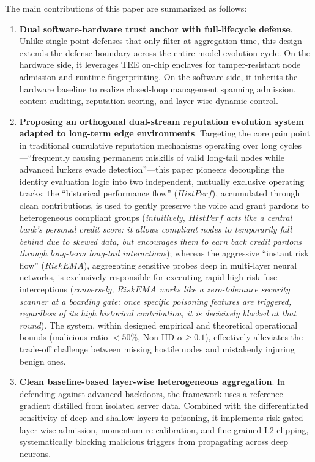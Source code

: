 \documentclass[runningheads]{llncs}
\begin{document}
The main contributions of this paper are summarized as follows:
\begin{enumerate}
    \item \textbf{Dual software-hardware trust anchor with full-lifecycle defense}. Unlike single-point defenses that only filter at aggregation time, this design extends the defense boundary across the entire model evolution cycle. On the hardware side, it leverages TEE on-chip enclaves for tamper-resistant node admission and runtime fingerprinting. On the software side, it inherits the hardware baseline to realize closed-loop management spanning admission, content auditing, reputation scoring, and layer-wise dynamic control.
    \item \textbf{Proposing an orthogonal dual-stream reputation evolution system adapted to long-term edge environments}. Targeting the core pain point in traditional cumulative reputation mechanisms operating over long cycles---``frequently causing permanent miskills of valid long-tail nodes while advanced lurkers evade detection''---this paper pioneers decoupling the identity evaluation logic into two independent, mutually exclusive operating tracks: the ``historical performance flow'' ($HistPerf$), accumulated through clean contributions, is used to gently preserve the voice and grant pardons to heterogeneous compliant groups (\textit{intuitively, $HistPerf$ acts like a central bank's personal credit score: it allows compliant nodes to temporarily fall behind due to skewed data, but encourages them to earn back credit pardons through long-term long-tail interactions}); whereas the aggressive ``instant risk flow'' ($RiskEMA$), aggregating sensitive probes deep in multi-layer neural networks, is exclusively responsible for executing rapid high-risk fuse interceptions (\textit{conversely, $RiskEMA$ works like a zero-tolerance security scanner at a boarding gate: once specific poisoning features are triggered, regardless of its high historical contribution, it is decisively blocked at that round}). The system, within designed empirical and theoretical operational bounds (malicious ratio $<50\%$, Non-IID $\alpha \geq 0.1$), effectively alleviates the trade-off challenge between missing hostile nodes and mistakenly injuring benign ones.
    \item \textbf{Clean baseline-based layer-wise heterogeneous aggregation}. In defending against advanced backdoors, the framework uses a reference gradient distilled from isolated server data. Combined with the differentiated sensitivity of deep and shallow layers to poisoning, it implements risk-gated layer-wise admission, momentum re-calibration, and fine-grained L2 clipping, systematically blocking malicious triggers from propagating across deep neurons.

\end{enumerate}
\end{document}
